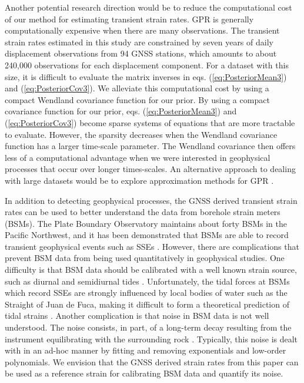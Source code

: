 \documentclass[extra,mreferee]{gji}
\begin{document}



Another potential research direction would be to reduce the
computational cost of our method for estimating transient strain
rates. GPR is generally computationally expensive when there are many
observations. The transient strain rates estimated in this study are
constrained by seven years of daily displacement observations from 94
GNSS stations, which amounts to about 240,000 observations for each
displacement component. For a dataset with this size, it is difficult
to evaluate the matrix inverses in eqs. (\ref{eq:PosteriorMean3}) and
(\ref{eq:PosteriorCov3}). We alleviate this computational cost by
using a compact Wendland covariance function for our prior. By using a
compact covariance function for our prior, eqs.
(\ref{eq:PosteriorMean3}) and (\ref{eq:PosteriorCov3}) become sparse
systems of equations that are more tractable to evaluate. However, the
sparsity decreases when the Wendland covariance function has a larger
time-scale parameter. The Wendland covariance then offers less of a
computational advantage when we were interested in geophysical
processes that occur over longer times-scales. An alternative approach
to dealing with large datasets would be to explore approximation
methods for GPR \citep[sec. 8]{Rasmussen2006}.


In addition to detecting geophysical processes, the GNSS derived
transient strain rates can be used to better understand the data from
borehole strain meters (BSMs). The Plate Boundary Observatory
maintains about forty BSMs in the Pacific Northwest, and it has been
demonstrated that BSMs are able to record transient geophysical events
such as SSEs \citep[e.g.,][]{Dragert2011}. However, there are
complications that prevent BSM data from being used quantitatively in
geophysical studies. One difficulty is that BSM data should be
calibrated with a well known strain source, such as diurnal and
semidiurnal tides \citep{Hart1996,Roeloffs2010,Hodgkinson2013}.
Unfortunately, the tidal forces at BSMs which record SSEs are strongly
influenced by local bodies of water such as the Straight of Juan de
Fuca, making it difficult to form a theoretical prediction of tidal
strains \citep{Roeloffs2010}. Another complication is that noise in
BSM data is not well understood. The noise consists, in part, of a
long-term decay resulting from the instrument equilibrating with the
surrounding rock \citep{Gladwin1987}. Typically, this noise is dealt
with in an ad-hoc manner by fitting and removing exponentials and
low-order polynomials. We envision that the GNSS derived strain rates
from this paper can be used as a reference strain for calibrating BSM
data and quantify its noise.
\end{document}
